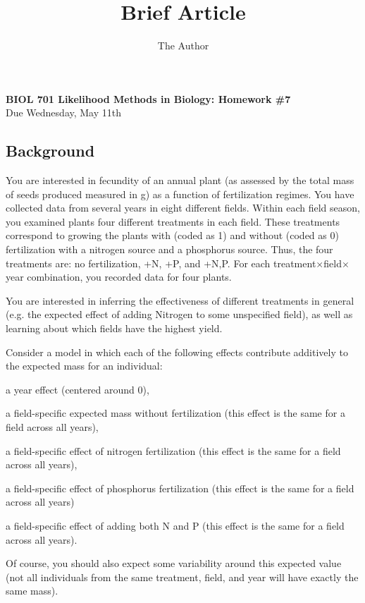 \documentclass[11pt]{article}
\title{Brief Article}
\author{The Author}
\begin{document}
\begin{center}
	{\bf BIOL 701  Likelihood Methods in Biology: Homework \#7}\\
	{Due Wednesday, May 11th} 
\end{center}
\subsection*{Background}
You are interested in fecundity of an annual plant (as assessed by the total mass of seeds produced measured in g) as a function of fertilization regimes.
You have collected data from several years in eight different fields.  
Within each field season, you examined plants four different treatments in each field.
These treatments correspond to growing the plants with (coded as 1) and without (coded as 0) fertilization with a nitrogen source and a phosphorus source.
Thus, the four treatments are: no fertilization, +N, +P, and +N,P.
For each treatment$\times$field$\times$year combination, you recorded data for four plants.

You are interested in inferring the effectiveness of different treatments in general (e.g. the expected effect of adding Nitrogen to some unspecified field), as well as learning about which fields have the highest yield.

Consider a model in which each of the following effects contribute additively to the expected mass for an individual:
\begin{compactenum}
	\item a year effect (centered around 0),
	\item a field-specific expected mass without fertilization (this effect is the same for a field across all years),
	\item a field-specific effect of nitrogen fertilization (this effect is the same for a field across all years),
	\item a field-specific effect of phosphorus fertilization (this effect is the same for a field across all years)
	\item a field-specific effect of adding both N and P (this effect is the same for a field across all years).
\end{compactenum}
Of course, you should also expect some variability around this expected value (not all individuals from the same treatment, field, and year will have exactly the same mass).
\end{document}
